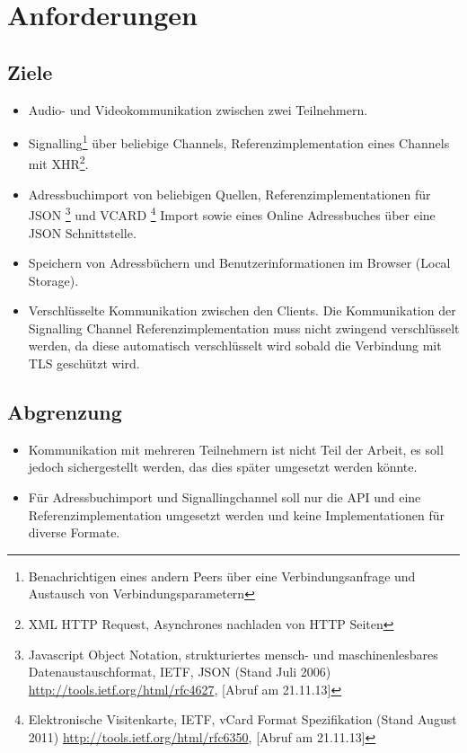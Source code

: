\chapter{Anforderungen}
	\section{Ziele}
		\begin{itemize}
			\item Audio- und Videokommunikation zwischen zwei Teilnehmern.
			\item Signalling\footnote{Benachrichtigen eines andern Peers über eine Verbindungsanfrage und Austausch von Verbindungsparametern} über beliebige Channels, Referenzimplementation eines Channels mit XHR\footnote{XML HTTP Request, Asynchrones nachladen von HTTP Seiten}.
			\item Adressbuchimport von beliebigen Quellen, Referenzimplementationen für JSON
				\footnote{Javascript Object Notation, strukturiertes mensch- und maschinenlesbares Datenaustauschformat, 
					IETF, JSON (Stand Juli 2006)
					\hyperlink{http://tools.ietf.org/html/rfc4627}{http://tools.ietf.org/html/rfc4627}, [Abruf am 21.11.13]
				} und VCARD
				\footnote{Elektronische Visitenkarte, IETF, vCard Format Spezifikation (Stand August 2011) 
					\hyperlink{http://tools.ietf.org/html/rfc6350}{http://tools.ietf.org/html/rfc6350}, [Abruf am 21.11.13]
				} Import sowie eines Online Adressbuches über eine JSON Schnittstelle.
			\item Speichern von Adressbüchern und Benutzerinformationen im Browser (Local Storage).
			\item Verschlüsselte Kommunikation zwischen den Clients. Die Kommunikation der Signalling Channel Referenzimplementation muss nicht zwingend verschlüsselt werden, da diese automatisch verschlüsselt wird sobald die Verbindung mit TLS geschützt wird.
		\end{itemize}

	
	\section{Abgrenzung}
		\begin{itemize}
			\item Kommunikation mit mehreren Teilnehmern ist nicht Teil der Arbeit, es soll jedoch sichergestellt werden, das dies später umgesetzt werden könnte.
			\item Für Adressbuchimport und Signallingchannel soll nur die API und eine Referenzimplementation umgesetzt werden und keine Implementationen für diverse Formate.
		\end{itemize}
		
